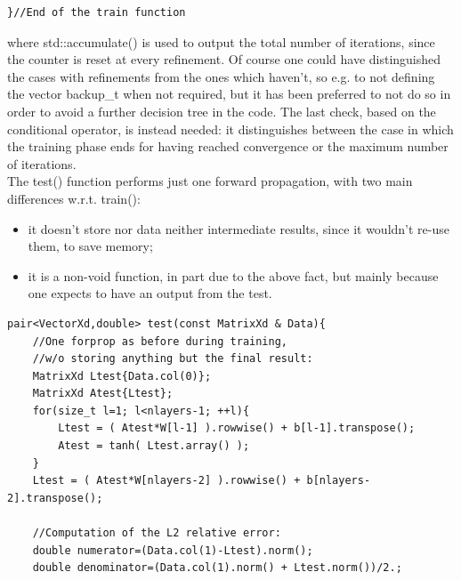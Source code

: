 \documentclass[12pt, a4paper]{report}
\theoremstyle{definition}
\begin{document}
{\begin{lstlisting}[frame=single, showstringspaces=false]
}//End of the train function
\end{lstlisting}
where {\ttfamily std::accumulate()} is used to output the total number of iterations, since the counter is reset at every refinement. Of course one could have distinguished the cases with refinements from the ones which haven't, so e.g. to not defining the vector {\ttfamily backup\_t} when not required, but it has been preferred to not do so in order to avoid a further decision tree in the code. The last check, based on the conditional operator, is instead needed: it distinguishes between the case in which the training phase ends for having reached convergence or the maximum number of iterations.\\
\newline \noindent The {\ttfamily test()} function performs just one forward propagation, with two main differences w.r.t. {\ttfamily train()}:
\begin{itemize}
	\item it doesn't store nor data neither intermediate results, since it wouldn't re-use them, to save memory;
	\item it is a non-void function, in part due to the above fact, but mainly because one expects to have an output from the test.
\end{itemize}
\begin{lstlisting}[frame=single]
pair<VectorXd,double> test(const MatrixXd & Data){
	//One forprop as before during training,
	//w/o storing anything but the final result:
	MatrixXd Ltest{Data.col(0)};
	MatrixXd Atest{Ltest};
	for(size_t l=1; l<nlayers-1; ++l){
		Ltest = ( Atest*W[l-1] ).rowwise() + b[l-1].transpose();
		Atest = tanh( Ltest.array() );	
	}
	Ltest = ( Atest*W[nlayers-2] ).rowwise() + b[nlayers-2].transpose();
	
	//Computation of the L2 relative error:
	double numerator=(Data.col(1)-Ltest).norm();
	double denominator=(Data.col(1).norm() + Ltest.norm())/2.;
	

\end{lstlisting}}
\end{document}
